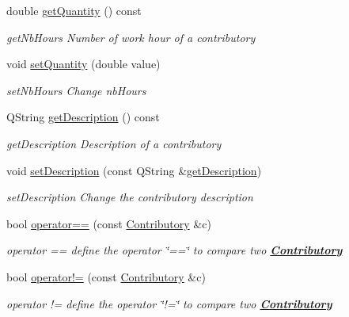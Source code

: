 \begin{DoxyCompactItemize}
double \hyperlink{classModels_1_1Contributory_a7c5fdd6e53641ae441054ebe7393f59d}{get\+Quantity} () const 
\begin{DoxyCompactList}\small\item\em get\+Nb\+Hours Number of work hour of a contributory \end{DoxyCompactList}\item 
void \hyperlink{classModels_1_1Contributory_afe02bdd167c6aed02c81a6e684293e99}{set\+Quantity} (double value)
\begin{DoxyCompactList}\small\item\em set\+Nb\+Hours Change nb\+Hours \end{DoxyCompactList}\item 
Q\+String \hyperlink{classModels_1_1Contributory_ae2b936f2fb1ccad2009eae9b5d12fc02}{get\+Description} () const 
\begin{DoxyCompactList}\small\item\em get\+Description Description of a contributory \end{DoxyCompactList}\item 
void \hyperlink{classModels_1_1Contributory_a12d4199fa7175c0b43f62eddf7c3d69e}{set\+Description} (const Q\+String \&\hyperlink{classModels_1_1Contributory_ae2b936f2fb1ccad2009eae9b5d12fc02}{get\+Description})
\begin{DoxyCompactList}\small\item\em set\+Description Change the contributory description \end{DoxyCompactList}\item 
bool \hyperlink{classModels_1_1Contributory_ad49c8b9cdf7254069e07f2238b42c8f3}{operator==} (const \hyperlink{classModels_1_1Contributory}{Contributory} \&c)
\begin{DoxyCompactList}\small\item\em operator == define the operator \char`\"{}==\char`\"{} to compare two {\bfseries \hyperlink{classModels_1_1Contributory}{Contributory}} \end{DoxyCompactList}\item 
bool \hyperlink{classModels_1_1Contributory_a0808e6453b222f62d3288361dcb56d16}{operator!=} (const \hyperlink{classModels_1_1Contributory}{Contributory} \&c)
\begin{DoxyCompactList}\small\item\em operator != define the operator \char`\"{}!=\char`\"{} to compare two {\bfseries \hyperlink{classModels_1_1Contributory}{Contributory}} \end{DoxyCompactList}\item 

\end{DoxyCompactItemize}
